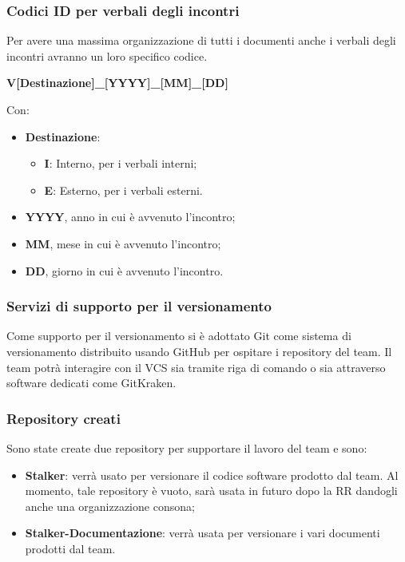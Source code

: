 \subsubsection{Codici ID per verbali degli incontri}
Per avere una massima organizzazione di tutti i documenti anche i verbali degli incontri avranno un loro specifico codice.
\begin{center}
	\textbf{V[Destinazione]\_[YYYY]\_[MM]\_[DD]}
\end{center}
Con:
\begin{itemize}
\item \textbf{Destinazione}:
	\begin{itemize}
		\item \textbf{I}: Interno, per i verbali interni;
		\item \textbf{E}: Esterno, per i verbali esterni.
	\end{itemize}	
\item \textbf{YYYY}, anno in cui è avvenuto l’incontro;
\item \textbf{MM}, mese in cui è avvenuto l’incontro;
\item \textbf{DD}, giorno in cui è avvenuto l’incontro.
	
\end{itemize}

\subsubsection{Servizi di supporto per il versionamento} 
Come supporto per il versionamento si è adottato Git come sistema di versionamento distribuito usando GitHub per ospitare i repository del team. Il team potrà interagire con il VCS sia tramite riga di comando o sia attraverso software dedicati come GitKraken.

\subsubsection{Repository creati}
Sono state create due repository per supportare il lavoro del team e sono:
\begin{itemize}
\item \textbf{Stalker}: verrà usato per versionare il codice software prodotto dal team. Al momento, tale repository è vuoto, sarà usata in futuro dopo la RR dandogli anche una organizzazione consona;
\item \textbf{Stalker-Documentazione}: verrà usata per versionare i vari documenti prodotti dal team.
\end{itemize}

